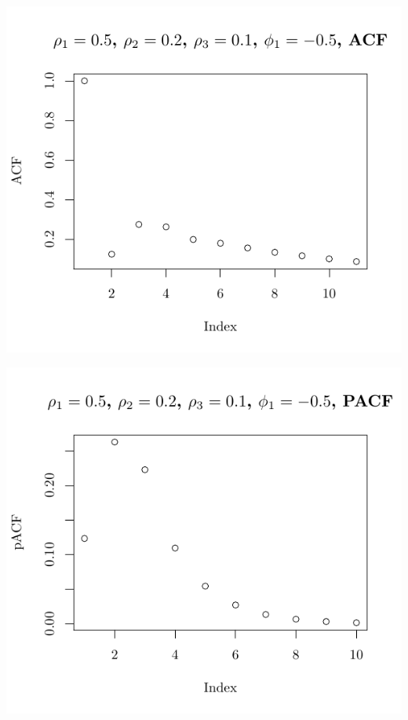 \documentclass[10pt]{paper}\usepackage[]{graphicx}\usepackage[]{color}
\makeatletter
\def\maxwidth{ %
  \ifdim\Gin@nat@width>\linewidth
    \linewidth
  \else
    \Gin@nat@width
  \fi
}
\newenvironment{knitrout}{}{} %
\makeatother
\begin{document}
\begin{knitrout}
{\centering \includegraphics[width=\maxwidth]{figure/graphics-plotter-141} 

}




{\centering \includegraphics[width=\maxwidth]{figure/graphics-plotter-142} 

}





\end{knitrout}
\end{document}

